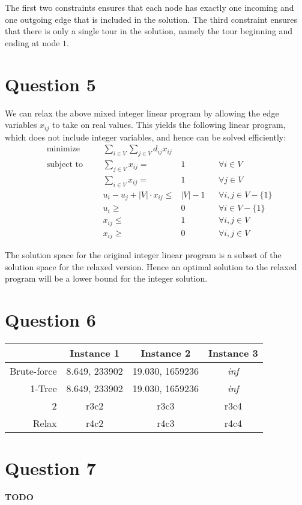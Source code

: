 \documentclass[a4paper, 10pt, oneside, article]{memoir}
\begin{document}
The first two constraints ensures that each node has exactly one
incoming and one outgoing edge that is included in the solution. The
third constraint ensures that there is only a single tour in the
solution, namely the tour beginning and ending at node $1$.


\section*{Question 5}

We can relax the above mixed integer linear program by allowing the
edge variables $x_{ij}$ to take on real values. This yields the
following linear program, which does not include integer variables,
and hence can be solved efficiently:
\begin{align*}
  &\text{minimize} &&& \sum_{i\in V} \sum_{j \in V} d_{ij} x_{ij} \\
  &\text{subject to} &&& \sum_{j \in V} x_{ij} ={}& 1 && \forall i \in V \\
  &                  &&& \sum_{i \in V} x_{ij} ={}& 1 && \forall j \in V \\
  &                  &&& u_i - u_j + |V| \cdot x_{ij} \leq{}& |V| - 1 && \forall i,j \in V - \{1\}  \\
  &                  &&& u_i \geq{}& 0 && \forall i \in V - \{1\} \\
  &                  &&& x_{ij} \leq{}& 1 && \forall i,j \in V \\
  &                  &&& x_{ij} \geq{}& 0 && \forall i,j \in V
\end{align*}

The solution space for the original integer linear program is a subset
of the solution space for the relaxed version. Hence an optimal
solution to the relaxed program will be a lower bound for the integer
solution.

\section*{Question 6}

\begin{tabular}{r | c c c }

 & Instance 1 & Instance 2 & Instance 3 \\
\hline

Brute-force & 8.649, 233902 & 19.030, 1659236 & \emph{inf} \\

1-Tree      & 8.649, 233902 & 19.030, 1659236 & \emph{inf} \\

2           & r3c2          & r3c3            & r3c4\\

Relax       & r4c2          & r4c3            & r4c4\\

\end{tabular}


\section*{Question 7}

\textbf{TODO}



\end{document}
